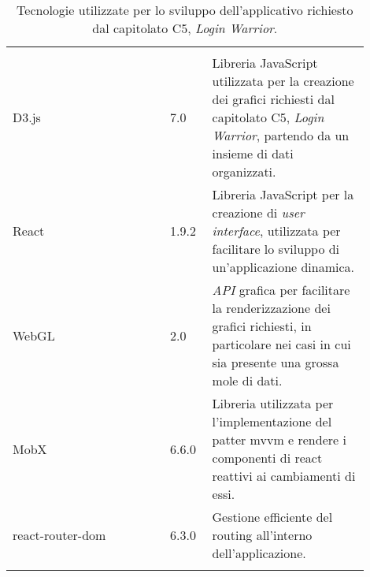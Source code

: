 {\begin{longtable}{>{\raggedright\arraybackslash}m{0.40\linewidth}m{0.10\linewidth}m{0.40\linewidth}}
    \rowcolor[RGB]{47, 106, 73}
    \multicolumn{3}{>{\centering\arraybackslash}m{0.953\linewidth}}{\textcolor{white}{\textbf{Librerie e Framework}}}\\

    \rowcolor[RGB]{216, 235, 171}
    D3.js & 7.0 & Libreria JavaScript utilizzata per la creazione dei grafici richiesti dal capitolato C5, \textit{Login Warrior}, partendo da un insieme di dati organizzati.\\

    \rowcolor[RGB]{233, 245, 206}
    React & 1.9.2 & Libreria JavaScript per la creazione di \textit{user interface}, utilizzata per facilitare lo sviluppo di un'applicazione dinamica.\\

    \rowcolor[RGB]{216, 235, 171}
    WebGL & 2.0 & \textit{API} grafica per facilitare la renderizzazione dei grafici richiesti, in particolare nei casi in cui sia presente una grossa mole di dati.\\

    \rowcolor[RGB]{233, 245, 206}
    MobX & 6.6.0 & Libreria utilizzata per l'implementazione del patter mvvm e
    rendere i componenti di react reattivi ai cambiamenti di essi.\\

    \rowcolor[RGB]{216, 235, 171}
    react-router-dom & 6.3.0 & Gestione efficiente del routing all'interno dell'applicazione.\\

    \caption{Tecnologie utilizzate per lo sviluppo dell'applicativo richiesto dal capitolato C5, \textit{Login Warrior}.}
\end{longtable}
}
